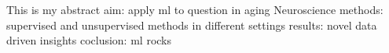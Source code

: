 This is my abstract 
aim: apply ml to question in aging Neuroscience
methods: supervised and unsupervised methods in different settings 
results: novel data driven insights 
coclusion: ml rocks